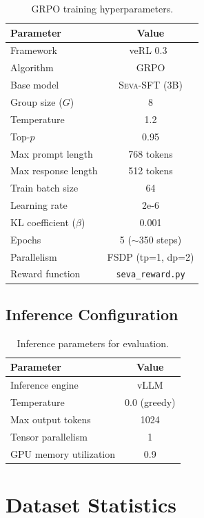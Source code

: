 \documentclass{article}
\newcommand{\seva}{\textsc{Seva}\xspace}
\begin{document}
\begin{table}[h]
\centering
\small
\caption{GRPO training hyperparameters.}
\label{tab:grpo_hyper}
\begin{tabular}{lc}
\toprule
\textbf{Parameter} & \textbf{Value} \\
\midrule
Framework & veRL 0.3~\citep{sheng2024hybridflow} \\
Algorithm & GRPO \\
Base model & \seva-SFT (3B) \\
Group size ($G$) & 8 \\
Temperature & 1.2 \\
Top-$p$ & 0.95 \\
Max prompt length & 768 tokens \\
Max response length & 512 tokens \\
Train batch size & 64 \\
Learning rate & 2e-6 \\
KL coefficient ($\beta$) & 0.001 \\
Epochs & 5 ($\sim$350 steps) \\
Parallelism & FSDP (tp=1, dp=2) \\
Reward function & \texttt{seva\_reward.py} \\
\bottomrule
\end{tabular}
\end{table}

\subsection{Inference Configuration}

\begin{table}[h]
\centering
\small
\caption{Inference parameters for evaluation.}
\label{tab:inference}
\begin{tabular}{lc}
\toprule
\textbf{Parameter} & \textbf{Value} \\
\midrule
Inference engine & vLLM \\
Temperature & 0.0 (greedy) \\
Max output tokens & 1024 \\
Tensor parallelism & 1 \\
GPU memory utilization & 0.9 \\
\bottomrule
\end{tabular}
\end{table}


\section{Dataset Statistics}
\label{app:data}
\end{document}
